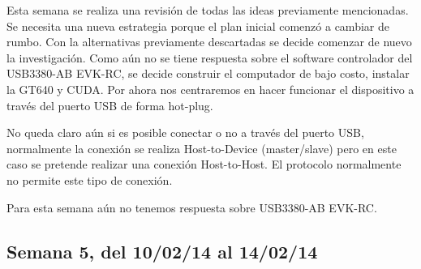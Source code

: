 \documentclass[11pt,oneside,titlepage]{article}
\begin{document}
Esta semana se realiza una revisión de todas las ideas previamente mencionadas. Se necesita una nueva estrategia porque el plan inicial comenzó a cambiar de rumbo. Con la alternativas previamente descartadas se decide comenzar de nuevo la investigación. Como aún no se tiene respuesta sobre el software controlador del USB3380-AB EVK-RC, se decide construir el computador de bajo costo, instalar la GT640 y CUDA. Por ahora nos centraremos en hacer funcionar el dispositivo a través del puerto USB de forma hot-plug. 

No queda claro aún si es posible conectar o no a través del puerto USB, normalmente la conexión se realiza Host-to-Device (master/slave) pero en este caso se pretende realizar una conexión Host-to-Host. El protocolo normalmente no permite este tipo de conexión.

Para esta semana aún no tenemos respuesta sobre USB3380-AB EVK-RC.

\subsection*{Semana 5, del 10/02/14 al 14/02/14}
\begin{comment}
lunes
- Ademas se realizó un estudio sobre como conectar el comptuador de una forma
plug and play, las opciones son utilizar el puerto Ethernet o, mejor aún,
realizar la conexión a trav\'es USB.

martes 
- Reunion con el profesor para ver el estado del proyecto. 3 ideas
  nuevas aparecieron.

miercoles 
- Contacto con un desarrollador de USB3380 para solicitar ayuda en el
  campo. 
- Estudio de RNDIS para conectar usb a usb, existe la posibilidad.

jueves 
- Estudio del funcionamiento de usb. Aprendi que podemos utilizar el
  computador como gadget y realizar la configuración recompilando el kernel y
  agregando los drivers.Mas detalles leer Linux Gadget Drivers
- Aún falta el cable. 
- Compilación del kernel para agregar los módulos. Estamos a la espera
  del cable USB macho macho.

viernes 
- Update del proyecto al profesor Claudio torres. 
 - compramos cable USB 3.0, estamos a la espera del envío.
\end{comment}
\end{document}
